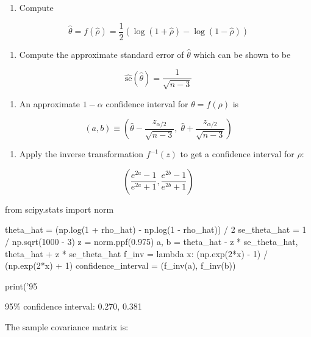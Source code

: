 \begin{enumerate}[tightlist,label={\arabic*.}]
\item
  Compute
\end{enumerate}

\[\hat{\theta} = f(\hat{\rho}) = \frac{1}{2} \left( \log(1 + \hat{\rho}) - \log(1 - \hat{\rho})\right) \]

\begin{enumerate}[tightlist,label={\arabic*.},resume]
\item
  Compute the approximate standard error of \(\hat{\theta}\) which can
  be shown to be
\end{enumerate}

\[\hat{\text{se}}(\hat{\theta}) = \frac{1}{\sqrt{n - 3}} \]

\begin{enumerate}[tightlist,label={\arabic*.},resume]
\item
  An approximate \(1 - \alpha\) confidence interval for
  \(\theta = f(\rho)\) is
\end{enumerate}

\[(a, b) \equiv \left(\hat{\theta} - \frac{z_{\alpha/2}}{\sqrt{n - 3}}, \; \hat{\theta} + \frac{z_{\alpha/2}}{\sqrt{n - 3}} \right)\]

\begin{enumerate}[tightlist,label={\arabic*.},resume]
\item
  Apply the inverse transformation \(f^{-1}(z)\) to get a confidence
  interval for \(\rho\):
\end{enumerate}

\[ \left( \frac{e^{2a} - 1}{e^{2a} + 1}, \frac{e^{2b} - 1}{e^{2b} + 1} \right) \]

\begin{python}
from scipy.stats import norm

theta_hat = (np.log(1 + rho_hat) - np.log(1 - rho_hat)) / 2
se_theta_hat = 1 / np.sqrt(1000 - 3)
z = norm.ppf(0.975)
a, b = theta_hat - z * se_theta_hat, theta_hat + z * se_theta_hat
f_inv = lambda x: (np.exp(2*x) - 1) / (np.exp(2*x) + 1)
confidence_interval = (f_inv(a), f_inv(b))

print('95%
\end{python}

\begin{console}
95\% confidence interval: 0.270, 0.381
\end{console}

The sample covariance matrix is:

